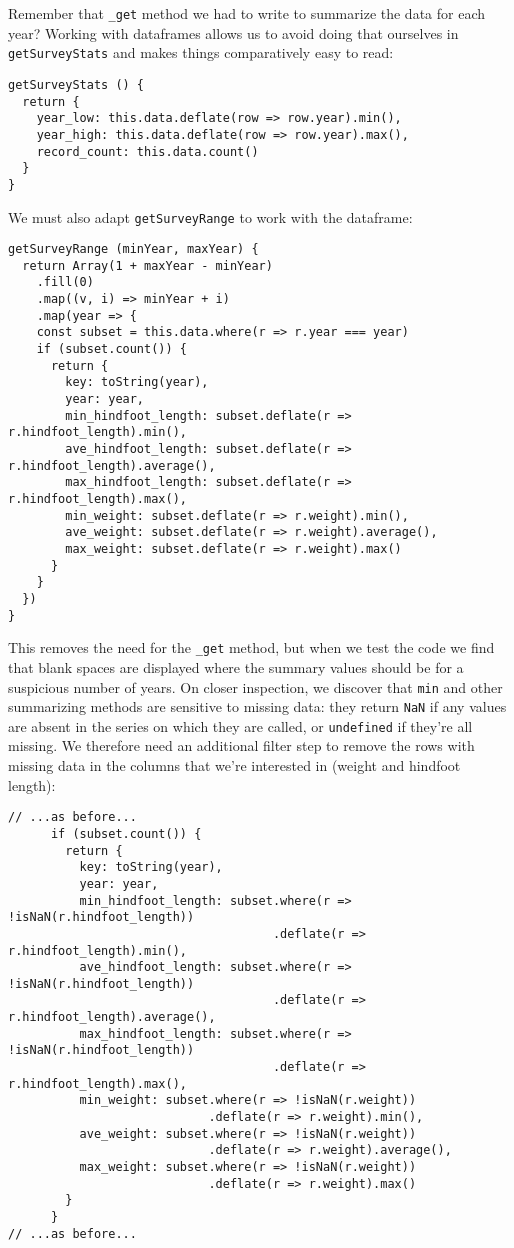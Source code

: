 Remember that \texttt{\_get} method we had to write to summarize the data for each year?
Working with dataframes allows us to avoid doing that ourselves in \texttt{getSurveyStats}
and makes things comparatively easy to read:

\begin{verbatim}
getSurveyStats () {
  return {
    year_low: this.data.deflate(row => row.year).min(),
    year_high: this.data.deflate(row => row.year).max(),
    record_count: this.data.count()
  }
}
\end{verbatim}

We must also adapt \texttt{getSurveyRange} to work with the dataframe:

\begin{verbatim}
getSurveyRange (minYear, maxYear) {
  return Array(1 + maxYear - minYear)
    .fill(0)
    .map((v, i) => minYear + i)
    .map(year => {
    const subset = this.data.where(r => r.year === year)
    if (subset.count()) {
      return {
        key: toString(year),
        year: year,
        min_hindfoot_length: subset.deflate(r => r.hindfoot_length).min(),
        ave_hindfoot_length: subset.deflate(r => r.hindfoot_length).average(),
        max_hindfoot_length: subset.deflate(r => r.hindfoot_length).max(),
        min_weight: subset.deflate(r => r.weight).min(),
        ave_weight: subset.deflate(r => r.weight).average(),
        max_weight: subset.deflate(r => r.weight).max()
      }
    }
  })
}
\end{verbatim}

This removes the need for the \texttt{\_get} method,
but when we test the code we find that blank spaces are displayed
where the summary values should be for a suspicious number of years.
On closer inspection,
we discover that \texttt{min} and other summarizing methods
are sensitive to missing data:
they return \texttt{NaN} if any values are absent in the series on which they are called,
or \texttt{undefined} if they're all missing.
We therefore need an additional filter step
to remove the rows with missing data in the columns
that we're interested in (weight and hindfoot length):

\begin{verbatim}
// ...as before...
      if (subset.count()) {
        return {
          key: toString(year),
          year: year,
          min_hindfoot_length: subset.where(r => !isNaN(r.hindfoot_length))
                                     .deflate(r => r.hindfoot_length).min(),
          ave_hindfoot_length: subset.where(r => !isNaN(r.hindfoot_length))
                                     .deflate(r => r.hindfoot_length).average(),
          max_hindfoot_length: subset.where(r => !isNaN(r.hindfoot_length))
                                     .deflate(r => r.hindfoot_length).max(),
          min_weight: subset.where(r => !isNaN(r.weight))
                            .deflate(r => r.weight).min(),
          ave_weight: subset.where(r => !isNaN(r.weight))
                            .deflate(r => r.weight).average(),
          max_weight: subset.where(r => !isNaN(r.weight))
                            .deflate(r => r.weight).max()
        }
      }
// ...as before...
\end{verbatim}

